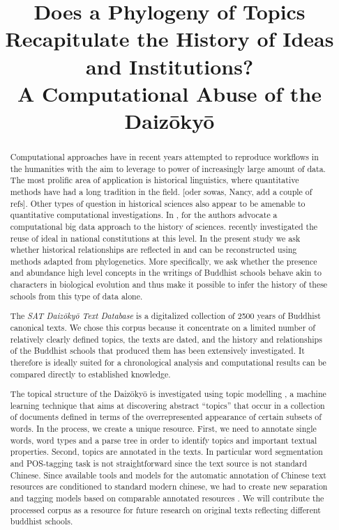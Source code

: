 \documentclass[a4paper,10pt]{article}
\title{Does a Phylogeny of Topics Recapitulate the History of Ideas and 
  Institutions? \\
  A Computational Abuse of the Daiz{\=o}ky{\=o}}
\author{}
\newcommand{\TODO}[1]{\begingroup\color{red}#1\endgroup}
\begin{document}
\maketitle

\begin{abstract}
  Computational approaches have in recent years attempted to reproduce
  workflows in the humanities with the aim to leverage to power of
  increasingly large amount of data. The most prolific area of application
  is historical linguistics, where quantitative methods have had a long
  tradition in the field. \TODO{[oder sowas, Nancy, add a couple of
    refs]}. Other types of question in historical sciences also appear to
  be amenable to quantitative computational investigations. In
  \cite{Laubichler:13}, for the authors advocate a computational big data
  approach to the history of sciences. \cite{Rockmore:16} recently
  investigated the reuse of ideal in national constitutions at this
  level. In the present study we ask whether historical relationships are
  reflected in and can be reconstructed using methods adapted from
  phylogenetics. More specifically, we ask whether the presence and
  abundance high level concepts in the writings of Buddhist \TODO{schools}
  behave akin to characters in biological evolution and thus make it
  possible to infer the history of these \TODO{schools} from this type of
  data alone. 

  The \textit{SAT Daiz{\=o}ky{\=o} Text Database} \cite{***} is a
  digitalized collection of 2500 years of Buddhist canonical texts. We
  chose this corpus because it concentrate on a limited number of
  relatively clearly defined topics, the texts are dated, and the history
  and relationships of the Buddhist schools that produced them has been
  extensively investigated. It therefore is ideally suited for a
  chronological analysis and computational results can be compared directly
  to established knowledge. 

  The topical structure of the Daiz{\=o}ky{\=o} is investigated using topic
  modelling \cite{Blei12}, a machine learning technique that aims at
  discovering abstract ``topics'' that occur in a collection of documents
  defined in terms of the overrepresented appearance of certain subsets of
  words. In the process, we create a unique resource. First, we need to
  annotate single words, word types and a parse tree in order to identify
  topics and important textual properties. Second, topics are annotated in
  the texts.  In particular word segmentation and POS-tagging task is not
  straightforward since the text source is not standard Chinese. Since
  available tools and models for the automatic annotation of Chinese text
  resources are conditioned to standard modern chinese, we had to create
  new separation and tagging models based on comparable annotated resources
  \cite{Lee14}.  We will contribute the processed corpus as a resource for
  future research on original texts reflecting different buddhist
  \TODO{schools}.


\end{abstract}
\end{document}

